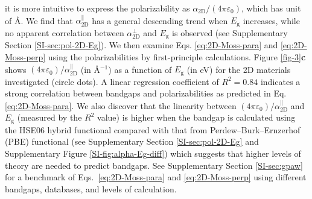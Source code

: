\documentclass[journal=ancac3,manuscript=article,email=true,hyperref=true,keywords=false]{achemso}
\begin{document}
it is more intuitive to express the polarizability as
$\alpha_{\mathrm{2D}}/(4 \pi \varepsilon_{0})$, which has unit of
\AA. We find that $\alpha_{\mathrm{2D}}^{\parallel}$ has a general
descending trend when $E_{\mathrm{g}}$ increases, while no apparent
correlation between $\alpha_{\mathrm{2D}}^{\perp}$ and
$E_{\mathrm{g}}$ is observed (see Supplementary Section
\ref{SI-sec:pol-2D-Eg}).  We then examine Eqs. \ref{eq:2D-Moss-para}
and \ref{eq:2D-Moss-perp} using the polarizabilities by
first-principle calculations.  Figure \ref{fig-3}{\textbf c} shows
$(4 \pi \varepsilon_{0})/\alpha_{\mathrm{2D}}^{\parallel}$ (in
\AA{}$^{-1}$) as a function of $E_{\mathrm{g}}$ (in eV) for the 2D
materials investigated (circle dots).  A linear regression coefficient
of $R^{2}=0.84$ indicates a strong correlation between bandgaps and
polarizabilities as predicted in Eq. \ref{eq:2D-Moss-para}.  We also
discover that the linearity between
$(4 \pi \varepsilon_{0})/\alpha_{\mathrm{2D}}^{\parallel}$ and
$E_{\mathrm{g}}$ (measured by the $R^{2}$ value) is higher when the
bandgap is calculated using the HSE06 hybrid
functional\cite{Heyd_2005} compared with that from
Perdew--Burk--Ernzerhof (PBE)
functional%
(see Supplementary Section \ref{SI-sec:pol-2D-Eg} and Supplementary
Figure \ref{SI-fig:alpha-Eg-diff}) which suggests that higher levels
of theory are needed to predict bandgaps. See Supplementary Section
\ref{SI-sec:gpaw} for a benchmark of Eqs.~\ref{eq:2D-Moss-para} and
\ref{eq:2D-Moss-perp} using different bandgaps, databases, and levels
of calculation.
\end{document}

